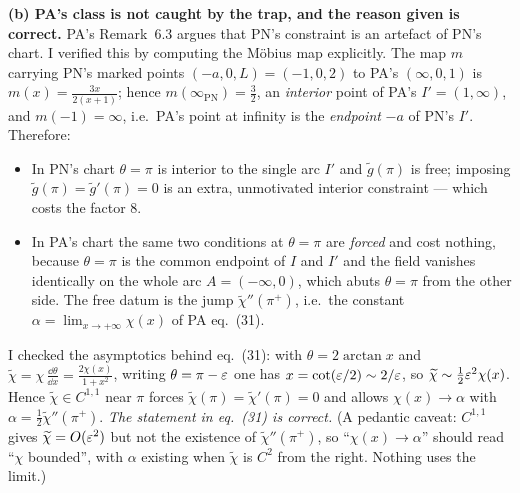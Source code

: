 \documentclass[11pt]{article}
\begin{document}
\textbf{(b) PA's class is not caught by the trap, and the reason given is correct.}  PA's
Remark~6.3 argues that PN's constraint is an artefact of PN's chart.  I verified this by computing
the M\"obius map explicitly.  The map $m$ carrying PN's marked points $(-a,0,L)=(-1,0,2)$ to PA's
$(\infty,0,1)$ is $m(x)=\frac{3x}{2(x+1)}$; hence $m(\infty_{\mathrm{PN}})=\tfrac32$, an
\emph{interior} point of PA's $I'=(1,\infty)$, and $m(-1)=\infty$, i.e.\ PA's point at infinity is the
\emph{endpoint} $-a$ of PN's $I'$.  Therefore:
\begin{itemize}[leftmargin=1.4em]
\item In PN's chart $\theta=\pi$ is interior to the single arc $I'$ and $\widetilde g(\pi)$ is free;
 imposing $\widetilde g(\pi)=\widetilde g'(\pi)=0$ is an extra, unmotivated interior constraint ---
 which costs the factor $8$.
\item In PA's chart the same two conditions at $\theta=\pi$ are \emph{forced} and cost nothing,
 because $\theta=\pi$ is the common endpoint of $I$ and $I'$ and the field vanishes identically on
 the whole arc $A=(-\infty,0)$, which abuts $\theta=\pi$ from the other side.  The free datum is the
 jump $\widetilde\chi''(\pi^+)$, i.e.\ the constant $\alpha=\lim_{x\to+\infty}\chi(x)$ of PA
 eq.~(31).
\end{itemize}
I checked the asymptotics behind eq.~(31): with $\theta=2\arctan x$ and $\widetilde\chi=\chi\,
\frac{\dd\theta}{\dd x}=\frac{2\chi(x)}{1+x^2}$, writing $\theta=\pi-\varepsilon$ one has
$x=\cot(\varepsilon/2)\sim2/\varepsilon$, so $\widetilde\chi\sim\tfrac12\varepsilon^2\chi(x)$.  Hence
$\widetilde\chi\in C^{1,1}$ near $\pi$ forces $\widetilde\chi(\pi)=\widetilde\chi'(\pi)=0$ and allows
$\chi(x)\to\alpha$ with $\alpha=\frac12\widetilde\chi''(\pi^+)$.  \emph{The statement in eq.~(31) is
correct.}  (A pedantic caveat: $C^{1,1}$ gives $\widetilde\chi=O(\varepsilon^2)$ but not the existence of
$\widetilde\chi''(\pi^+)$, so ``$\chi(x)\to\alpha$'' should read ``$\chi$ bounded'', with $\alpha$
existing when $\widetilde\chi$ is $C^2$ from the right.  Nothing uses the limit.)
\end{document}
